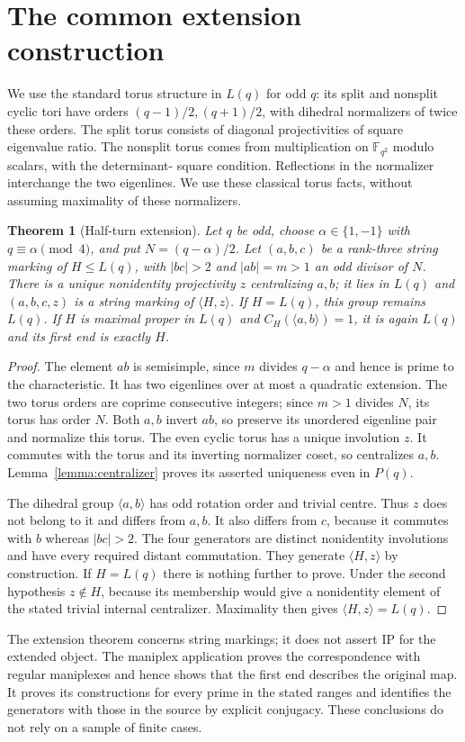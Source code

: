 \documentclass[11pt,a4paper]{article}
\newtheorem{theorem}{Theorem}
\begin{document}
\section{The common extension construction}
We use the standard torus structure in $L(q)$ for odd $q$: its split and
nonsplit cyclic tori have orders $(q-1)/2,(q+1)/2$, with dihedral
normalizers of twice these orders. The split torus consists of diagonal
projectivities of square eigenvalue ratio. The nonsplit torus comes from
multiplication on $\mathbb F_{q^2}$ modulo scalars, with the determinant-
square condition. Reflections in the normalizer interchange the two
eigenlines. We use these classical torus facts, without assuming maximality of
these normalizers.

\begin{theorem}[Half-turn extension]\label{thm:extension}
Let $q$ be odd, choose $\alpha\in\{1,-1\}$ with $q\equiv\alpha\pmod4$,
and put $N=(q-\alpha)/2$. Let $(a,b,c)$ be a rank-three string marking
of $H\le L(q)$, with $|bc|>2$ and $|ab|=m>1$ an odd divisor of $N$.
There is a unique nonidentity projectivity $z$ centralizing $a,b$;
it lies in $L(q)$ and $(a,b,c,z)$ is a string marking of $\langle H,z\rangle$.
If $H=L(q)$, this group remains $L(q)$. If $H$ is maximal proper in
$L(q)$ and $C_H(\langle a,b\rangle)=1$, it is again $L(q)$ and its
first end is exactly $H$.
\end{theorem}
\begin{proof}
The element $ab$ is semisimple, since $m$ divides $q-\alpha$ and hence
is prime to the characteristic. It has two eigenlines over at most a
quadratic extension. The two torus orders are coprime consecutive integers;
since $m>1$ divides $N$, its torus has order $N$. Both $a,b$ invert
$ab$, so preserve its unordered eigenline pair and normalize this torus.
The even cyclic torus has a unique involution $z$. It commutes with the
torus and its inverting normalizer coset, so centralizes $a,b$.
Lemma~\ref{lemma:centralizer} proves its asserted uniqueness even in
$P(q)$.

The dihedral group $\langle a,b\rangle$ has odd rotation order and
trivial centre. Thus $z$ does not belong to it and differs from $a,b$.
It also differs from $c$, because it commutes with $b$ whereas $|bc|>2$.
The four generators are distinct nonidentity involutions and have every
required distant commutation. They generate $\langle H,z\rangle$ by
construction. If $H=L(q)$ there is nothing further to prove. Under the
second hypothesis $z\notin H$, because its membership would give a
nonidentity element of the stated trivial internal centralizer.
Maximality then gives $\langle H,z\rangle=L(q)$.
\end{proof}
The extension theorem concerns string markings; it does not assert IP
for the extended object. The maniplex application proves the correspondence with regular
maniplexes and hence shows that the first end describes the original map.
It proves its constructions for every prime in the stated ranges and
identifies the generators with those in the source by explicit conjugacy.
These conclusions do not rely on a sample of finite cases.
\end{document}
